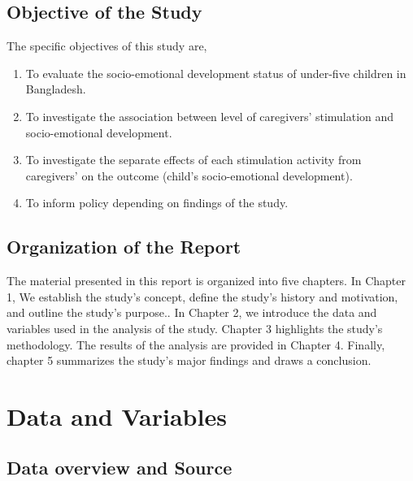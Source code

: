 \documentclass[
  12pt,
  oneside]{report}
\providecommand{\tightlist}{%
  \setlength{\itemsep}{0pt}\setlength{\parskip}{0pt}}
\begin{document}
\newpage

\hypertarget{objective-of-the-study}{%
\section{Objective of the Study}\label{objective-of-the-study}}

The specific objectives of this study are,

\begin{enumerate}
\def\labelenumi{\arabic{enumi})}
\tightlist
\item
  To evaluate the socio-emotional development status of under-five children in Bangladesh.
\item
  To investigate the association between level of caregivers' stimulation and socio-emotional development.
\item
  To investigate the separate effects of each stimulation activity from caregivers' on the outcome (child's socio-emotional development).
\item
  To inform policy depending on findings of the study.
\end{enumerate}

\hypertarget{organization-of-the-report}{%
\section{Organization of the Report}\label{organization-of-the-report}}

The material presented in this report is organized into five chapters. In Chapter 1, We establish the study's concept, define the study's history and motivation, and outline the study's purpose.. In Chapter 2, we introduce the data and variables used in the analysis of the study. Chapter 3 highlights the study's methodology. The results of the analysis are provided in Chapter 4. Finally, chapter 5 summarizes the study's major findings and draws a conclusion.

\newpage

\hypertarget{data-and-variables}{%
\chapter{Data and Variables}\label{data-and-variables}}

\hypertarget{data-overview-and-source}{%
\section{Data overview and Source}\label{data-overview-and-source}}
\end{document}
